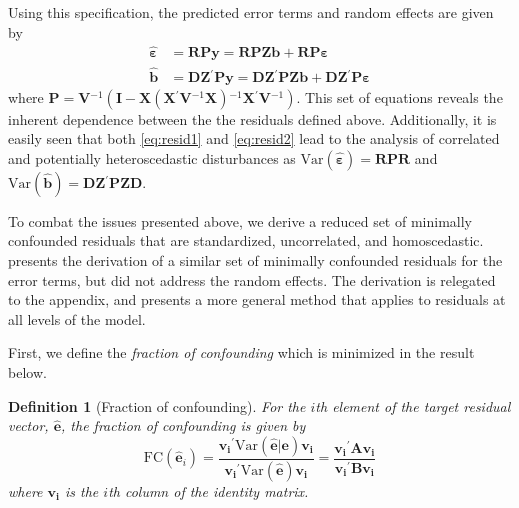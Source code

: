 \documentclass{article} %
\newtheorem{definition}{Definition}
\newcommand{\inv}{\ensuremath{^{-1}}}
\newcommand{\trans}{\ensuremath{^\prime}}
\newcommand{\var}{\ensuremath{\mathrm{Var}}}
\begin{document}
Using this specification, the predicted error terms and random effects are given by 
%
\begin{align}
\widehat{\bm{\varepsilon}} &= \bm{RPy} = \bm{RPZb} + \bm{RP \varepsilon} \label{eq:resid1}\\
\widehat{\bm{b}} &= \bm{DZ}\trans \bm{Py} = \bm{DZ}\trans \bm{PZb} + \bm{DZ}\trans \bm{P \varepsilon} \label{eq:resid2}
\end{align}
%
where $\bm{P} = \bm{V}\inv( \bm{I} - \bm{X} (\bm{X}\trans \bm{V}\inv \bm{X})\inv \bm{X}\trans \bm{V}\inv)$. This  set of equations %
reveals the inherent dependence between the the residuals defined above.
Additionally, it is easily seen that both \eqref{eq:resid1} and \eqref{eq:resid2} lead to the analysis of correlated and potentially heteroscedastic disturbances as $\var(\widehat{\bm{\varepsilon}}) = \bm{RPR}$ and $\var(\widehat{\bm{b}}) = \bm{DZ}\trans \bm{PZD}$.

To combat the issues presented above, we derive a reduced set of minimally confounded residuals that are standardized, uncorrelated, and homoscedastic. \cite{HildenMinton:1995wh} presents the derivation of a similar set of minimally confounded residuals for the error terms, but did not address the random effects. The derivation is relegated to the appendix, and presents a more general method that applies to residuals at all levels of the model.

First, we define the \emph{fraction of confounding} \citep{HildenMinton:1995wh} which is minimized in the result below. \\

\begin{definition}[Fraction of confounding]\label{def:fc1}
For the $i$th element of the target residual vector, $\widehat{\bm{e}}$, the fraction of confounding is given by
%
\begin{equation}\label{eq:fc}
	\text{FC}(\widehat{\bm{e}}_i) 
	= \frac{\bm{v_i}\trans \var(\widehat{\bm{e}} | \bm{e}) \bm{v_i}}
		{\bm{v_i}\trans \var(\widehat{\bm{e}}) \bm{v_i}}
	= \frac{\bm{v_i}\trans \bm{A} \bm{v_i}}
		{\bm{v_i}\trans \bm{B} \bm{v_i}}
\end{equation}
%
where $\bm{v_i}$ is the $i$th column of the identity matrix.
\end{definition}
\end{document}
